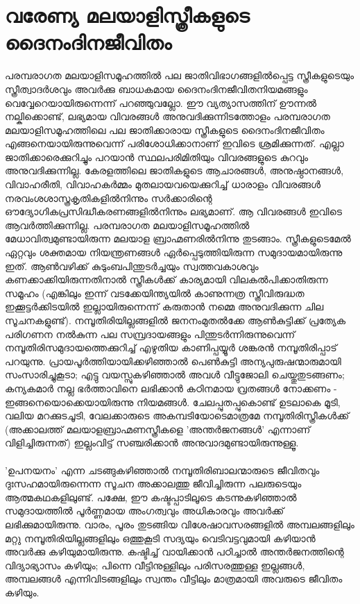 \section{വരേണ്യ മലയാളിസ്ത്രീകളുടെ ദൈനംദിനജീവിതം}
പരമ്പരാഗത മലയാളിസമൂഹത്തിൽ പല ജാതിവിഭാഗങ്ങളിൽപ്പെട്ട സ്ത്രീകളുടെയും സ്ത്രീത്വാദർശവും അവർക്കു ബാധകമായ ദൈനംദിനജീവിതനിയമങ്ങളും വെവ്വേറെയായിരുന്നെന്ന് പറഞ്ഞുവല്ലോ. ഈ വ്യത്യാസത്തിന് ഊന്നൽ നല്കിക്കൊണ്ട്, ലഭ്യമായ വിവരങ്ങൾ അനുവദിക്കുന്നിടത്തോളം പരമ്പരാഗത മലയാളിസമൂഹത്തിലെ പല ജാതിക്കാരായ സ്ത്രീകളുടെ ദൈനംദിനജീവിതം എങ്ങനെയായിരുന്നുവെന്ന് പരിശോധിക്കാനാണ് ഇവിടെ ശ്രമിക്കുന്നത്. എല്ലാ ജാതിക്കാരെക്കുറിച്ചും പറയാൻ സ്ഥലപരിമിതിയും വിവരങ്ങളുടെ കുറവും അനുവദിക്കുന്നില്ല. കേരളത്തിലെ ജാതികളുടെ ആചാരങ്ങൾ, അനുഷ്ഠാനങ്ങൾ, വിവാഹരീതി, വിവാഹകർമ്മം മുതലായവയെക്കുറിച്ച് ധാരാളം വിവരങ്ങൾ നരവംശശാസ്ത്രകൃതികളിൽനിന്നും സർക്കാരിന്റെ ഔദ്യോഗികപ്രസിദ്ധീകരണങ്ങളിൽനിന്നും ലഭ്യമാണ്. ആ വിവരങ്ങൾ ഇവിടെ ആവർത്തിക്കുന്നില്ല.
പരമ്പരാഗത മലയാളിസമൂഹത്തിൽ മേധാവിത്വമുണ്ടായിരുന്ന മലയാള ബ്രാഹ്മണരിൽനിന്നു തുടങ്ങാം. സ്ത്രീകളുടെമേൽ ഏറ്റവും ശക്തമായ നിയന്ത്രണങ്ങൾ ഏർപ്പെടുത്തിയിരുന്ന സമുദായമായിരുന്നു ഇത്. ആൺവഴിക്ക് കുടുംബപിന്തുടർച്ചയും സ്വത്തവകാശവും കണക്കാക്കിയിരുന്നതിനാൽ സ്ത്രീകൾക്ക് കാര്യമായി വിലകൽപിക്കാതിരുന്ന സമൂഹം (എങ്കിലും ഇന്ന് വടക്കേയിന്ത്യയിൽ കാണുന്നത്ര സ്ത്രീവിരുദ്ധത ഇക്കൂട്ടർക്കിടയിൽ ഇല്ലായിരുന്നെന്ന് കരുതാൻ നമ്മെ അനുവദിക്കുന്ന ചില സൂചനകളുണ്ട്). നമ്പൂതിരിയില്ലങ്ങളിൽ ജനനംമുതൽക്കേ ആൺകുട്ടിക്ക് പ്രത്യേക പരിഗണന നൽകുന്ന പല സമ്പ്രദായങ്ങളും പിന്തുടർന്നിരുന്നുവെന്ന് നമ്പൂതിരിസമുദായത്തെക്കുറിച്ച് എഴുതിയ കാണിപ്പയ്യൂർ ശങ്കരൻ നമ്പൂതിരിപ്പാട് പറയുന്നു. പ്രായപൂർത്തിയായിക്കഴിഞ്ഞാൽ പെൺകുട്ടി അന്യപുരുഷന്മാരുമായി സംസാരിച്ചുകൂടാ; എട്ടു വയസ്സുകഴിഞ്ഞാൽ അവൾ വീട്ടുജോലി ചെയ്തുതുടങ്ങണം; കന്യകമാർ നല്ല ഭർത്താവിനെ ലഭിക്കാൻ കഠിനമായ വ്രതങ്ങൾ നോക്കണം - ഇങ്ങനെയൊക്കെയായിരുന്നു നിയമങ്ങൾ. ചേലപ്പുതപ്പുകൊണ്ട് ഉടലാകെ മൂടി, വലിയ മറക്കുടചൂടി, വേലക്കാരുടെ അകമ്പടിയോടെമാത്രമേ നമ്പൂതിരിസ്ത്രീകൾക്ക് (അക്കാലത്ത് മലയാളബ്രാഹ്മണസ്ത്രീകളെ 'അന്തർജനങ്ങൾ' എന്നാണ് വിളിച്ചിരുന്നത്) ഇല്ലംവിട്ട് സഞ്ചരിക്കാൻ അനുവാദമുണ്ടായിരുന്നുള്ളൂ.

\paragraph{}'ഉപനയനം' എന്ന ചടങ്ങുകഴിഞ്ഞാൽ നമ്പൂതിരിബാലന്മാരുടെ ജീവിതവും ദുഃസഹമായിരുന്നെന്ന സൂചന അക്കാലത്തു ജീവിച്ചിരുന്ന പലരുടെയും ആത്മകഥകളിലുണ്ട്. പക്ഷേ, ഈ കഷ്ടപ്പാടിലൂടെ കടന്നുകഴിഞ്ഞാൽ സമുദായത്തിൽ പൂർണ്ണമായ അംഗത്വവും അധികാരവും അവർക്ക് ലഭിക്കുമായിരുന്നു. വാരം, പൂരം തുടങ്ങിയ വിശേഷാവസരങ്ങളിൽ അമ്പലങ്ങളിലും മറ്റു നമ്പൂതിരിയില്ലങ്ങളിലും ഒത്തുകൂടി സദ്യയും വെടിവട്ടവുമായി കഴിയാൻ അവർക്കു കഴിയുമായിരുന്നു. കഷ്ടിച്ച് വായിക്കാൻ പഠിച്ചാൽ അന്തർജനത്തിന്റെ വിദ്യാഭ്യാസം കഴിയും; പിന്നെ വീട്ടിനുള്ളിലും പരിസരത്തുള്ള ഇല്ലങ്ങൾ, അമ്പലങ്ങൾ എന്നിവിടങ്ങളിലും സ്വന്തം വീട്ടിലും മാത്രമായി അവരുടെ ജീവിതം കഴിയും.

